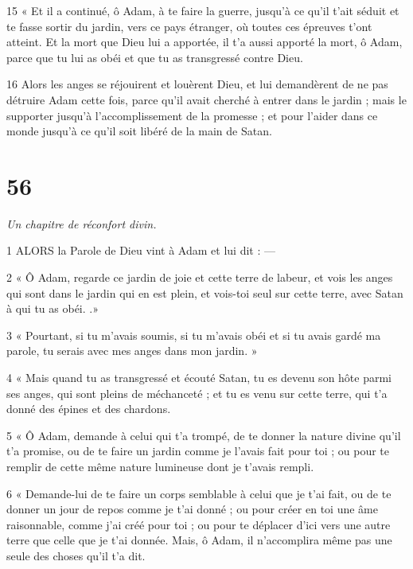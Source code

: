 \par 15 « Et il a continué, ô Adam, à te faire la guerre, jusqu'à ce qu'il t'ait séduit et te fasse sortir du jardin, vers ce pays étranger, où toutes ces épreuves t'ont atteint. Et la mort que Dieu lui a apportée, il t'a aussi apporté la mort, ô Adam, parce que tu lui as obéi et que tu as transgressé contre Dieu.

\par 16 Alors les anges se réjouirent et louèrent Dieu, et lui demandèrent de ne pas détruire Adam cette fois, parce qu'il avait cherché à entrer dans le jardin ; mais le supporter jusqu'à l'accomplissement de la promesse ; et pour l'aider dans ce monde jusqu'à ce qu'il soit libéré de la main de Satan.

\chapter{56}

\par \textit{Un chapitre de réconfort divin.}

\par 1 ALORS la Parole de Dieu vint à Adam et lui dit : —

\par 2 « Ô Adam, regarde ce jardin de joie et cette terre de labeur, et vois les anges qui sont dans le jardin qui en est plein, et vois-toi seul sur cette terre, avec Satan à qui tu as obéi. .»

\par 3 « Pourtant, si tu m'avais soumis, si tu m'avais obéi et si tu avais gardé ma parole, tu serais avec mes anges dans mon jardin. »

\par 4 « Mais quand tu as transgressé et écouté Satan, tu es devenu son hôte parmi ses anges, qui sont pleins de méchanceté ; et tu es venu sur cette terre, qui t'a donné des épines et des chardons.

\par 5 « Ô Adam, demande à celui qui t'a trompé, de te donner la nature divine qu'il t'a promise, ou de te faire un jardin comme je l'avais fait pour toi ; ou pour te remplir de cette même nature lumineuse dont je t'avais rempli.

\par 6 « Demande-lui de te faire un corps semblable à celui que je t'ai fait, ou de te donner un jour de repos comme je t'ai donné ; ou pour créer en toi une âme raisonnable, comme j'ai créé pour toi ; ou pour te déplacer d'ici vers une autre terre que celle que je t'ai donnée. Mais, ô Adam, il n’accomplira même pas une seule des choses qu’il t’a dit.

